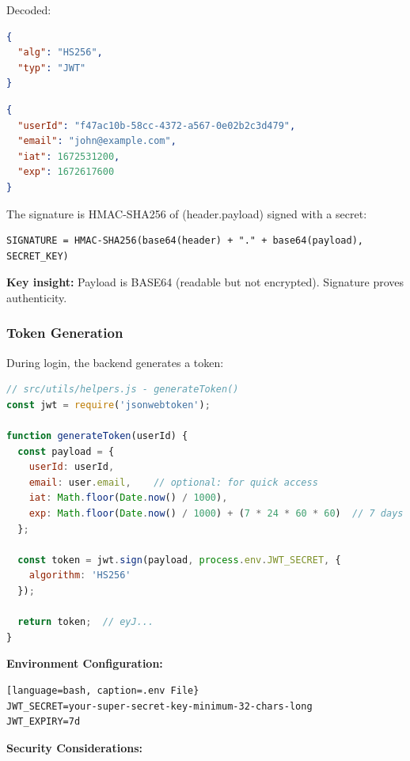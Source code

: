 \documentclass[12pt,a4paper,oneside]{article}
\begin{document}
Decoded:

\begin{lstlisting}[language=JSON, caption=JWT Header]
{
  "alg": "HS256",
  "typ": "JWT"
}
\end{lstlisting}

\begin{lstlisting}[language=JSON, caption=JWT Payload]
{
  "userId": "f47ac10b-58cc-4372-a567-0e02b2c3d479",
  "email": "john@example.com",
  "iat": 1672531200,
  "exp": 1672617600
}
\end{lstlisting}

The signature is HMAC-SHA256 of (header.payload) signed with a secret:

\begin{lstlisting}[language=text]
SIGNATURE = HMAC-SHA256(base64(header) + "." + base64(payload), SECRET_KEY)
\end{lstlisting}

\textbf{Key insight:} Payload is BASE64 (readable but not encrypted). Signature proves authenticity.

\subsubsection{Token Generation}

During login, the backend generates a token:

\begin{lstlisting}[language=JavaScript, caption=Token Generation Code]
// src/utils/helpers.js - generateToken()
const jwt = require('jsonwebtoken');

function generateToken(userId) {
  const payload = {
    userId: userId,
    email: user.email,    // optional: for quick access
    iat: Math.floor(Date.now() / 1000),
    exp: Math.floor(Date.now() / 1000) + (7 * 24 * 60 * 60)  // 7 days
  };
  
  const token = jwt.sign(payload, process.env.JWT_SECRET, {
    algorithm: 'HS256'
  });
  
  return token;  // eyJ...
}
\end{lstlisting}

\textbf{Environment Configuration:}

\begin{lstlisting}[language=bash, caption=.env File}
JWT_SECRET=your-super-secret-key-minimum-32-chars-long
JWT_EXPIRY=7d
\end{lstlisting}

\textbf{Security Considerations:}
\end{document}
